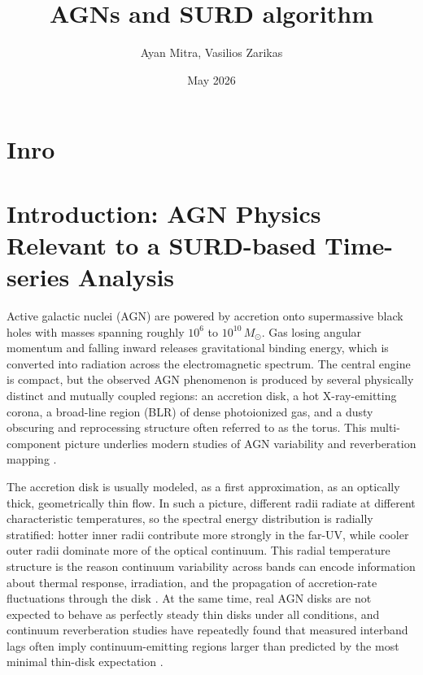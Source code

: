 \documentclass{article}
\title{AGNs and SURD algorithm}
\author{ Ayan Mitra, Vasilios Zarikas}
\date{May 2026}
\begin{document}
\maketitle


\section{Inro}

\section{Introduction: AGN Physics Relevant to a SURD-based Time-series Analysis}
\label{sec:intro_agn_physics}

Active galactic nuclei (AGN) are powered by accretion onto supermassive black holes with masses spanning roughly \(10^6\) to \(10^{10}\,M_\odot\). Gas losing angular momentum and falling inward releases gravitational binding energy, which is converted into radiation across the electromagnetic spectrum. The central engine is compact, but the observed AGN phenomenon is produced by several physically distinct and mutually coupled regions: an accretion disk, a hot X-ray-emitting corona, a broad-line region (BLR) of dense photoionized gas, and a dusty obscuring and reprocessing structure often referred to as the torus. This multi-component picture underlies modern studies of AGN variability and reverberation mapping \cite{Cackett2021,Peterson2006,Netzer2015}.

The accretion disk is usually modeled, as a first approximation, as an optically thick, geometrically thin flow. In such a picture, different radii radiate at different characteristic temperatures, so the spectral energy distribution is radially stratified: hotter inner radii contribute more strongly in the far-UV, while cooler outer radii dominate more of the optical continuum. This radial temperature structure is the reason continuum variability across bands can encode information about thermal response, irradiation, and the propagation of accretion-rate fluctuations through the disk \cite{Cackett2021,Fausnaugh2017}. At the same time, real AGN disks are not expected to behave as perfectly steady thin disks under all conditions, and continuum reverberation studies have repeatedly found that measured interband lags often imply continuum-emitting regions larger than predicted by the most minimal thin-disk expectation \cite{Fausnaugh2017,Fian2023}.
\end{document}
